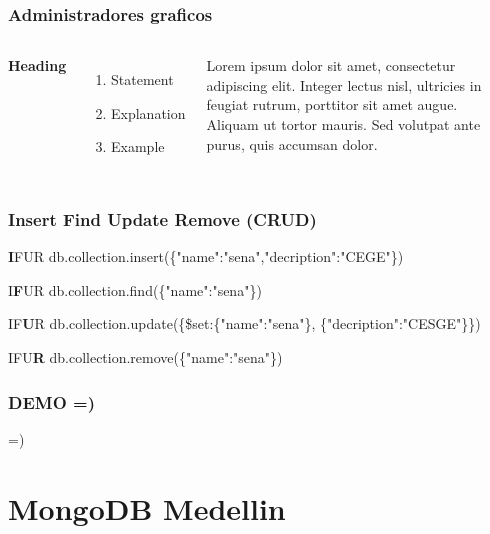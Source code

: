 \documentclass{beamer}
\begin{document}
\begin{frame}
\frametitle{Administradores graficos}
\begin{columns}[c] %

\textbf{Heading}
\begin{enumerate}
\item Statement
\item Explanation
\item Example
\end{enumerate}

Lorem ipsum dolor sit amet, consectetur adipiscing elit. Integer lectus nisl, ultricies in feugiat rutrum, porttitor sit amet augue. Aliquam ut tortor mauris. Sed volutpat ante purus, quis accumsan dolor.

\end{columns}
\end{frame}

\begin{frame}
\frametitle{Insert Find Update Remove (CRUD)}
\begin{block}{\textbf{I}FUR}
db.collection.insert(\{"name":"sena","decription":"CEGE"\})
\end{block}
\begin{block}{I\textbf{F}UR}
db.collection.find(\{"name":"sena"\})
\end{block}
\begin{block}{IF\textbf{U}R}
db.collection.update(\{\$set:\{"name":"sena"\},
\{"decription":"CESGE"\}\})
\end{block}
\begin{block}{IFU\textbf{R}}
db.collection.remove(\{"name":"sena"\})
\end{block}
\end{frame}


\begin{frame}
\frametitle{DEMO =)}
=)
\end{frame}

\section{MongoDB Medellin}
\end{document}

